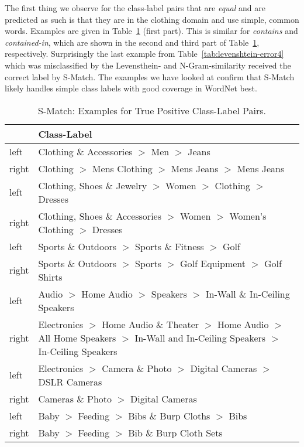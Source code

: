 The first thing we observe for the class-label pairs that are \emph{equal} and are predicted as such is that they are in the
clothing domain and use simple, common words.
Examples are given in Table~\ref{tab:smatch-correct} (first part).
This is similar for \emph{contains} and \emph{contained-in}, which are shown in the second and third part of Table~\ref{tab:smatch-correct}, respectively.
Surprisingly the last example from Table~\ref{tab:levenshtein-error4} which was misclassified by the Levensthein- and
N-Gram-similarity received the correct label by S-Match.
The examples we have looked at confirm that S-Match likely handles simple class labels with good coverage in WordNet
best.
\begin{table}[htbp]
    \begin{center}
        \begin{tabularx}{\textwidth}{lX}
            & Class-Label \\
            \hline
            left & Clothing \& Accessories $>$ Men $>$ Jeans \\
            right & Clothing $>$ Mens Clothing $>$ Mens Jeans $>$ Mens Jeans \\
            \hline
            left & Clothing, Shoes \& Jewelry $>$ Women $>$ Clothing $>$ Dresses \\
            right & Clothing, Shoes \& Accessories $>$ Women $>$ Women's Clothing $>$ Dresses \\
            \hline
            \hline
            left & Sports \& Outdoors $>$ Sports \& Fitness $>$ Golf \\
            right & Sports \& Outdoors $>$ Sports $>$ Golf Equipment $>$ Golf Shirts \\
            \hline
            left & Audio $>$ Home Audio $>$ Speakers $>$ In-Wall \& In-Ceiling Speakers \\
            right & Electronics $>$ Home Audio \& Theater $>$ Home Audio $>$ All Home Speakers $>$ In-Wall and In-Ceiling Speakers $>$ In-Ceiling Speakers \\
            \hline
            \hline
            left & Electronics $>$ Camera \& Photo $>$ Digital Cameras $>$ DSLR Cameras \\
            right & Cameras \& Photo $>$ Digital Cameras \\
            \hline
            left & Baby $>$ Feeding $>$ Bibs \& Burp Cloths $>$ Bibs \\
            right & Baby $>$ Feeding $>$ Bib \& Burp Cloth Sets \\
        \end{tabularx}
        \caption{S-Match: Examples for True Positive Class-Label Pairs.}
        \label{tab:smatch-correct}
    \end{center}
\end{table}

